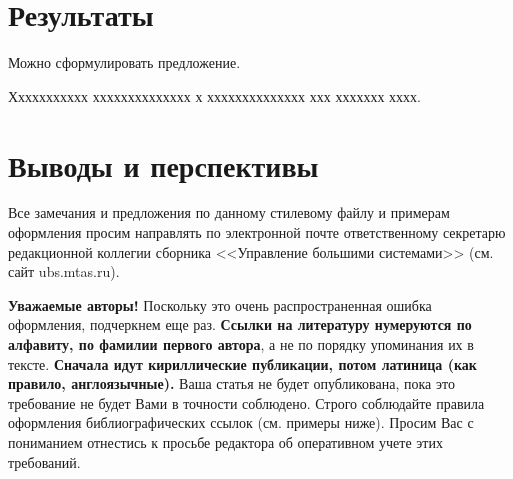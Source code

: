 \documentclass[11pt]{ubs}
\begin{document}
\section{Результаты}

Можно сформулировать предложение.
\begin{proposition}
Ххххххххххх хххххххххххххх х хххххххххххххх ххх ххххххх хххх.
\end{proposition}

\section{Выводы и перспективы}
Все замечания и предложения по данному стилевому файлу и примерам оформления просим направлять по электронной почте ответственному секретарю редакционной коллегии сборника <<Управление большими системами>> (см. сайт ubs.mtas.ru).

\textbf{Уважаемые авторы!} Поскольку это очень распространенная ошибка оформления, подчеркнем еще раз.\textbf{ Ссылки на литературу нумеруются по алфавиту, по фамилии первого автора}, а не по порядку упоминания их в тексте. \textbf{Сначала идут кириллические публикации, потом латиница (как правило, англоязычные).} Ваша статья не будет опубликована, пока это требование не будет Вами в точности соблюдено. Строго соблюдайте правила оформления библиографических ссылок (см. примеры ниже). Просим Вас с пониманием отнестись к просьбе редактора об оперативном учете этих требований.
\end{document}

